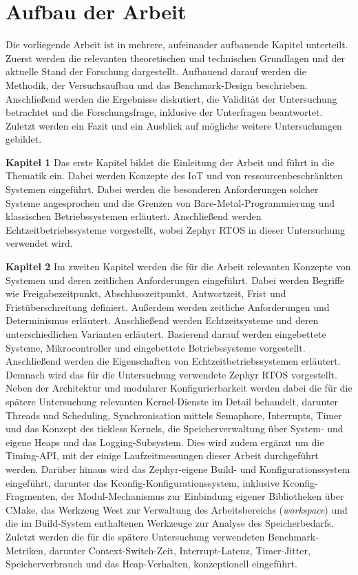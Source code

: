 \section{Aufbau der Arbeit}
Die vorliegende Arbeit ist in mehrere, aufeinander aufbauende Kapitel unterteilt. Zuerst werden die relevanten theoretischen und technischen Grundlagen und der aktuelle Stand der Forschung dargestellt. Aufbauend darauf werden die Methodik, der Versuchsaufbau und das Benchmark-Design beschrieben. Anschlie{\ss}end werden die Ergebnisse diskutiert, die Validit{\"a}t der Untersuchung betrachtet und die Forschungsfrage, inklusive der Unterfragen beantwortet. Zuletzt werden ein Fazit und ein Ausblick auf m{\"o}gliche weitere Untersuchungen gebildet.

\textbf{Kapitel 1 }Das erste Kapitel bildet die Einleitung der Arbeit und f{\"u}hrt in die Thematik ein. Dabei werden Konzepte des IoT und von ressourcenbeschr{\"a}nkten Systemen eingef{\"u}hrt. Dabei werden die besonderen Anforderungen solcher Systeme angesprochen und die Grenzen von Bare-Metal-Programmierung und klassischen Betriebssystemen erl{\"a}utert. Anschlie{\ss}end werden Echtzeitbetriebssysteme vorgestellt, wobei Zephyr RTOS in dieser Untersuchung verwendet wird.

\textbf{Kapitel 2 }Im zweiten Kapitel werden die f{\"u}r die Arbeit relevanten Konzepte von Systemen und deren zeitlichen Anforderungen eingef{\"u}hrt. Dabei werden Begriffe wie Freigabezeitpunkt, Abschlusszeitpunkt, Antwortzeit, Frist und Frist{\"u}berschreitung definiert. Au{\ss}erdem werden zeitliche Anforderungen und Determinismus erl{\"a}utert. Anschlie{\ss}end werden Echtzeitsysteme und deren unterschiedlichen Varianten erl{\"a}utert. Basierend darauf werden eingebettete Systeme, Mikrocontroller und eingebettete Betriebssysteme vorgestellt. Anschlie{\ss}end werden die Eigenschaften von Echtzeitbetriebssystemen erl{\"a}utert. Demnach wird das f{\"u}r die Untersuchung verwendete Zephyr RTOS vorgestellt. Neben der Architektur und modularer Konfigurierbarkeit werden dabei die f{\"u}r die sp{\"a}tere Untersuchung relevanten Kernel-Dienste im Detail behandelt, darunter Threads und Scheduling, Synchronisation mittels Semaphore, Interrupts, Timer und das Konzept des tickless Kernels, die Speicherverwaltung {\"u}ber System- und eigene Heaps und das Logging-Subsystem. Dies wird zudem erg{\"a}nzt um die Timing-API, mit der einige Laufzeitmessungen dieser Arbeit durchgef{\"u}hrt werden. Dar{\"u}ber hinaus wird das Zephyr-eigene Build- und Konfigurationssystem eingef{\"u}hrt, darunter das Kconfig-Konfigurationssystem, inklusive Kconfig-Fragmenten, der Modul-Mechanismus zur Einbindung eigener Bibliotheken {\"u}ber CMake, das Werkzeug West zur Verwaltung des Arbeitsbereichs (\emph{workspace}) und die im Build-System enthaltenen Werkzeuge zur Analyse des Speicherbedarfs. Zuletzt werden die f{\"u}r die sp{\"a}tere Untersuchung verwendeten Benchmark-Metriken, darunter Context-Switch-Zeit, Interrupt-Latenz, Timer-Jitter, Speicherverbrauch und das Heap-Verhalten, konzeptionell eingef{\"u}hrt.

